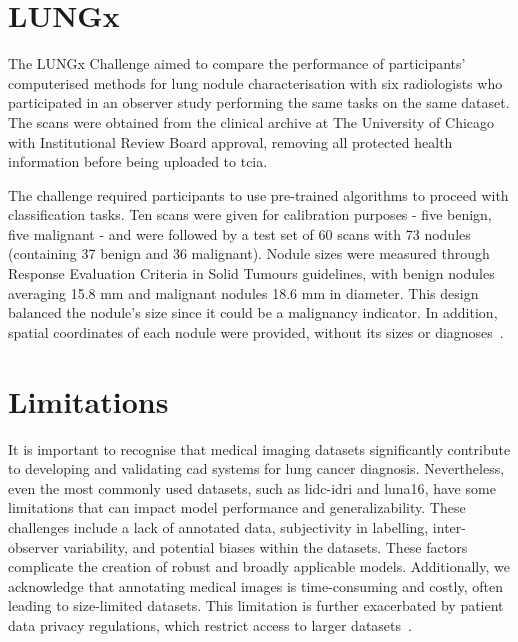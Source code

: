 \section{LUNGx}\label{lungx}
The LUNGx Challenge aimed to compare the performance of participants' computerised methods for lung nodule characterisation with six radiologists who participated in an observer study performing the same tasks on the same dataset. The scans were obtained from the clinical archive at The University of Chicago with Institutional Review Board approval, removing all protected health information before being uploaded to \ac{tcia}. %

The challenge required participants to use pre-trained algorithms to proceed with classification tasks. Ten scans were given for calibration purposes - five benign, five malignant - and were followed by a test set of 60 scans with 73 nodules (containing 37 benign and 36 malignant). 
Nodule sizes were measured through Response Evaluation Criteria in Solid Tumours guidelines, with benign nodules averaging 15.8 mm and malignant nodules 18.6 mm in diameter. This design balanced the nodule's size since it could be a malignancy indicator. In addition, spatial coordinates of each nodule were provided, without its sizes or diagnoses~\cite{kirby_lungx_2016}.


\section{Limitations}

It is important to recognise that medical imaging datasets significantly contribute to developing and validating \ac{cad} systems for lung cancer diagnosis. Nevertheless, even the most commonly used datasets, such as \ac{lidc-idri} and \ac{luna16}, have some limitations that can impact model performance and generalizability. These challenges include a lack of annotated data, subjectivity in labelling, inter-observer variability, and potential biases within the datasets. These factors complicate the creation of robust and broadly applicable models. Additionally, we acknowledge that annotating medical images is time-consuming and costly, often leading to size-limited datasets. This limitation is further exacerbated by patient data privacy regulations, which restrict access to larger datasets~\cite{gu_survey_2021}.
   